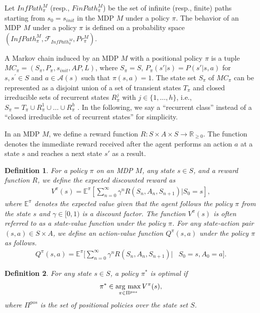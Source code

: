 \documentclass[letterpaper, 10 pt, conference]{ieeeconf}  %
\newtheorem{definition}{Definition}
\newcommand{\argmax}{\mathop{\rm arg~max}\limits}
\begin{document}
Let $InfPath^{M}_{\pi}$ (resp., $FinPath^{M}_{\pi}$) be the set of infinite (resp., finite) paths starting from $s_0=s_{init}$ in the MDP $M$ under a policy $\pi$. The behavior of an MDP $M$ under a policy $\pi$ is defined on a probability space $(InfPath^{M}_{\pi}, \mathcal{F}_{InfPath^{M}_{\pi}}, Pr^{M}_{\pi})$. %

A Markov chain induced by an MDP $M$ with a positional policy $\pi$ is a tuple $MC_{\pi} = (S_{\pi},P_{\pi},s_{init},AP,L)$, where $S_{\pi} = S$, $P_{\pi}(s'|s) = P(s'|s,a)$ for $s, s^{\prime} \in S$ and $a \in \mathcal{A}(s)$ such that $\pi(s,a) = 1$.
The state set $S_{\pi}$ of $MC_{\pi}$ can be represented as a disjoint union of a set of transient states $T_{\pi}$ and closed irreducible sets of recurrent states $R^j_{\pi}$ with $j \in \{ 1, \ldots ,h \}$, i.e., $ S_{\pi} = T_{\pi} \cup R^1_{\pi} \cup \ldots \cup R^h_{\pi} $ \cite{ESS}.
In the following, we say a ``recurrent class'' instead of a ``closed irreducible set of recurrent states'' for simplicity.

In an MDP $M$, we define a reward function $R:S \times A \times S \rightarrow \mathbb{R}_{\geq 0}$. The function denotes the immediate reward received after the agent performs an action $a$ at a state $s$ and reaches a next state $s'$ as a result.

\begin{definition}
  For a policy $\pi$ on an MDP $M$, any state $s \in S$, and a reward function $R$, we define the expected discounted reward as
  \begin{align*}
    V^{\pi}(s)= \mathbb{E}^{\pi}[\sum_{n=0}^{\infty}\gamma^n R(S_n, A_n, S_{n+1})|S_0 = s],
  \end{align*}
where $\mathbb{E}^{\pi}$ denotes the expected value given that the agent follows the policy $\pi$ from the state $s$ and $\gamma \in [0,1)$ is a discount factor. The function $V^{\pi}(s)$ is often referred to as a state-value function under the policy $\pi$. For any state-action pair $(s,a) \in S \times A$, we define an action-value function $Q^{\pi}(s,a)$ under the policy $\pi$ as follows.
  \begin{align*}
    Q^{\pi}(s,a)= \mathbb{E}^{\pi}[\sum_{n=0}^{\infty}\gamma^n R(S_n, A_n, S_{n+1})|&S_0 = s, A_0 = a].
  \end{align*}
\end{definition}

\begin{definition}
  For any state $s \in S$, a policy $\pi^{\ast}$ is optimal if
  \begin{align*}
    \pi^{\ast} \in \argmax_{\pi \in \Pi^{pos}} V^{\pi}(s),
  \end{align*}
where $\Pi^{pos}$ is the set of positional policies over the state set $S$.
\end{definition}
\end{document}
